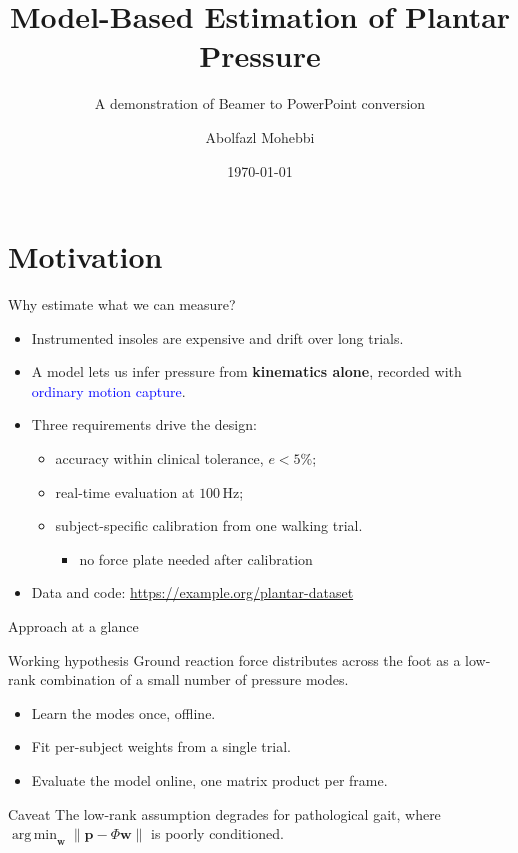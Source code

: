 \documentclass[aspectratio=43]{beamer}
\title{Model-Based Estimation of Plantar Pressure}
\subtitle{A demonstration of Beamer to PowerPoint conversion}
\author{Abolfazl Mohebbi}
\institute{Polytechnique Montr\'eal}
\date{\today}
\newcommand{\vect}[1]{\mathbf{#1}}
\newcommand{\unit}[1]{\,\mathrm{#1}}
\DeclareMathOperator*{\argmin}{arg\,min}
\begin{document}
\begin{frame}
  \titlepage
\end{frame}

\section{Motivation}

\begin{frame}{Why estimate what we can measure?}
  \begin{itemize}
    \item Instrumented insoles are \alert{expensive} and drift over long trials.
    \item A model lets us infer pressure from \textbf{kinematics alone},
          recorded with \textcolor{blue}{ordinary motion capture}.
    \item Three requirements drive the design:
      \begin{itemize}
        \item accuracy within clinical tolerance, $e < 5\%$;
        \item real-time evaluation at $100\unit{Hz}$;
        \item subject-specific calibration from one walking trial.
          \begin{itemize}
            \item[$\star$] no force plate needed after calibration
          \end{itemize}
      \end{itemize}
    \item Data and code: \url{https://example.org/plantar-dataset}
  \end{itemize}
\end{frame}

\begin{frame}{Approach at a glance}
  \begin{block}{Working hypothesis}
    Ground reaction force distributes across the foot as a low-rank
    combination of a small number of pressure modes.
  \end{block}

  \begin{itemize}
    \item Learn the modes once, offline.
    \pause
    \item Fit per-subject weights from a single trial.
    \item<3-> Evaluate the model online, one matrix product per frame.
  \end{itemize}

  \begin{alertblock}{Caveat}
    The low-rank assumption degrades for pathological gait, where
    $\argmin_{\vect{w}} \|\vect{p} - \Phi\vect{w}\|$ is poorly conditioned.
  \end{alertblock}
\end{frame}
\end{document}
